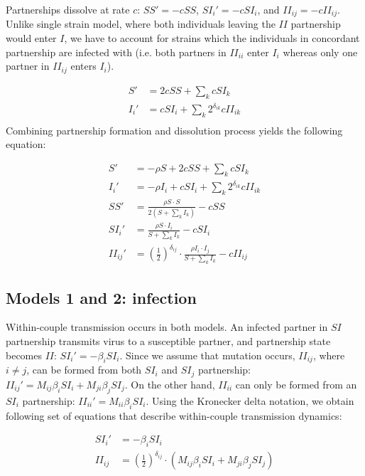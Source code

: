 \documentclass[10pt,letterpaper]{article}
\newcommand{\khalf}{\left(\frac{1}{2}\right)^{\delta_{ij}}}  %
\begin{document}
Partnerships dissolve at rate $c$: $SS' = -c SS$, $SI_i' = -c SI_i$, and $II_{ij} = - c II_{ij}$. Unlike single strain model, where both individuals leaving the $II$ partnership would enter $I$, we have to account for strains which the individuals in concordant partnership are infected with (i.e. both partners in $II_{ii}$ enter $I_i$ whereas only one partner in $II_{ij}$ enters $I_i$).

\begin{equation}
\begin{aligned}
S' &= 2 c SS + \sum_k c SI_k \\
I_i' &= c SI_i + \sum_k 2^{\delta_{ik}} c II_{ik}\\
\end{aligned}
\end{equation}
Combining partnership formation and dissolution process yields the following equation:

\begin{equation}
\begin{aligned}
S' &= - \rho S + 2 c SS + \sum_k c SI_k \\
I_i' &= - \rho I_i + c SI_i + \sum_k 2^{\delta_{ik}} c II_{ik}\\
SS' &= \frac{\rho S \cdot S}{2 (S + \sum_k I_k)} - c SS\\
SI_i' &= \frac{\rho S \cdot I_i}{S + \sum_k I_k} - c SI_i\\
II_{ij}' &= \khalf \cdot \frac{\rho I_i \cdot I_j}{S + \sum_k I_k} - c II_{ij}
\end{aligned}
\end{equation}

\subsection*{Models 1 and 2: infection}

Within-couple transmission occurs in both models. An infected partner in $SI$ partnership transmits virus to a susceptible partner, and partnership state becomes $II$: $SI_i' = - \beta_i SI_i$. Since we assume that mutation occurs, $II_{ij}$, where $i \neq j$, can be formed from both $SI_i$ and $SI_j$ partnership: $II_{ij}' = M_{ij} \beta_i SI_i + M_{ji} \beta_j SI_j$. On the other hand, $II_{ii}$ can only be formed from an $SI_i$ partnership: $II_{ii}' = M_{ii} \beta_i SI_i$. Using the Kronecker delta notation, we obtain following set of equations that describe within-couple transmission dynamics:

\begin{equation}
\begin{aligned}
SI_i' &= - \beta_i SI_i\\
II_{ij} &=  \khalf \cdot (M_{ij} \beta_i SI_i + M_{ji} \beta_j SI_j)
\end{aligned}
\end{equation}
\end{document}
